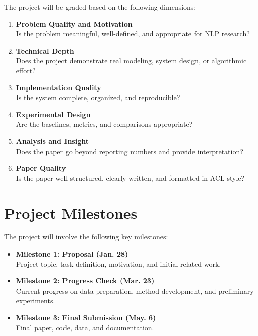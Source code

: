 \documentclass{article}
\begin{document}
The project will be graded based on the following dimensions:

\begin{enumerate}[label=\arabic*.]
  \item \textbf{Problem Quality and Motivation} \\
  Is the problem meaningful, well-defined, and appropriate for NLP research?

  \item \textbf{Technical Depth} \\
  Does the project demonstrate real modeling, system design, or algorithmic effort?

  \item \textbf{Implementation Quality} \\
  Is the system complete, organized, and reproducible?

  \item \textbf{Experimental Design} \\
  Are the baselines, metrics, and comparisons appropriate?

  \item \textbf{Analysis and Insight} \\
  Does the paper go beyond reporting numbers and provide interpretation?

  \item \textbf{Paper Quality} \\
  Is the paper well-structured, clearly written, and formatted in ACL style?
\end{enumerate}

\section{Project Milestones}

The project will involve the following key milestones:

\begin{itemize}
  \item \textbf{Milestone 1: Proposal (Jan. 28)} \\
  Project topic, task definition, motivation, and initial related work.

  \item \textbf{Milestone 2: Progress Check (Mar. 23)} \\
  Current progress on data preparation, method development, and preliminary experiments.

  \item \textbf{Milestone 3: Final Submission (May. 6)} \\
  Final paper, code, data, and documentation.
\end{itemize}
\end{document}
